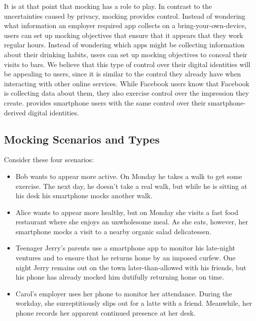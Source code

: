 It is at that point that mocking has a role to play. In contrast to the
uncertainties caused by privacy, mocking provides control. Instead of
wondering what information an employer required app collects on a
bring-your-own-device, users can set up mocking objectives that
ensure that it appears that they work regular hours. Instead of wondering
which apps might be collecting information about their drinking habits, users
can set up mocking objectives to conceal their visits to bars. We believe
that this type of control over their digital identities will be appealing
to users, since it is similar to the control they already have when
interacting with other online services. While Facebook users know that
Facebook is collecting data about them, they also exercise control over the
impression they create. \PocketMocker{} provides smartphone users with the
same control over their smartphone-derived digital identities.

\subsection{Mocking Scenarios and Types}

Consider these four scenarios:

\begin{itemize}

\item Bob wants to appear more active. On Monday he takes a walk to get some
exercise. The next day, he doesn't take a real walk, but while he is sitting
at his desk his smartphone mocks another walk.

\item Alice wants to appear more healthy, but on Monday she visits a fast
food restaurant where she enjoys an unwholesome meal. As she eats, however, her
smartphone mocks a visit to a nearby organic salad delicatessen.

\item Teenager Jerry's parents use a smartphone app to monitor his late-night
  ventures and to ensure that he returns home by an imposed curfew. One
  night Jerry remains out on the town later-than-allowed with his friends,
  but his phone has already mocked him dutifully returning home on time.

\item Carol's employer uses her phone to monitor her attendance. During the
workday, she surreptitiously slips out for a latte with a friend.  Meanwhile,
her phone records her apparent continued presence at her desk.

\end{itemize}

